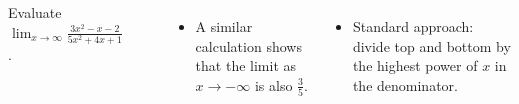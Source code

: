 \begin{frame}
\begin{example}[Example 5, p. 130]
\begin{columns}[c]
Evaluate $\lim_{x\to \infty} \frac{3x^2-x-2}{5x^2+4x+1}$.

\ %
%
%
\begin{itemize}
\item<22->  A similar calculation shows that the limit as $x\to -\infty$ is also $\frac{3}{5}$.
\end{itemize}
\begin{itemize}
\item<2-| alert@2-3>  Standard approach: divide top and bottom by the highest power of $x$ in the denominator.
\end{itemize}

\end{columns}
\end{example}
\end{frame}
